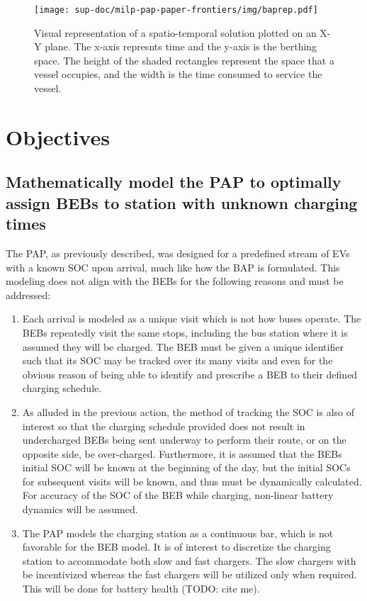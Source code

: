 \documentclass[ee,msthesis]{usuthesis}
\begin{document}
\begin{figure}[htbp]
\centering
\texttt{[image: sup-doc/milp-pap-paper-frontiers/img/baprep.pdf]}
\caption{\label{img:baprep}Visual representation of a spatio-temporal solution plotted on an X-Y plane. The x-axis represnts time and the y-axis is the berthing space. The height of the shaded rectangles represent the space that a vessel occupies, and the width is the time consumed to service the vessel.}
\end{figure}
\chapter{Objectives}
\label{sec:objectives}
\section{Mathematically model the PAP to optimally assign BEBs to station with unknown charging times}
\label{sec:org4877f63}
The PAP, as previously described, was designed for a predefined stream of EVs with a known SOC upon arrival, much like
how the BAP is formulated. This modeling does not align with the BEBs for the following reasons and must be addressed:

\begin{enumerate}
\item Each arrival is modeled as a unique visit which is not how buses operate. The BEBs repeatedly visit the same stops,
including the bus station where it is assumed they will be charged. The BEB must be given a unique identifier such
that its SOC may be tracked over its many visits and even for the obvious reason of being able to identify and
prescribe a BEB to their defined charging schedule.

\item As alluded in the previous action, the method of tracking the SOC is also of interest so that the charging schedule
provided does not result in undercharged BEBs being sent underway to perform their route, or on the opposite side, be
over-charged. Furthermore, it is assumed that the BEBs initial SOC will be known at the beginning of the day, but the
initial SOCs for subsequent visits will be known, and thus must be dynamically calculated. For accuracy of the SOC of
the BEB while charging, non-linear battery dynamics will be assumed.

\item The PAP models the charging station as a continuous bar, which is not favorable for the BEB model. It is of interest
to discretize the charging station to accommodate both slow and fast chargers. The slow chargers with be incentivized
whereas the fast chargers will be utilized only when required. This will be done for battery health (TODO: cite me).
\end{enumerate}
\end{document}
